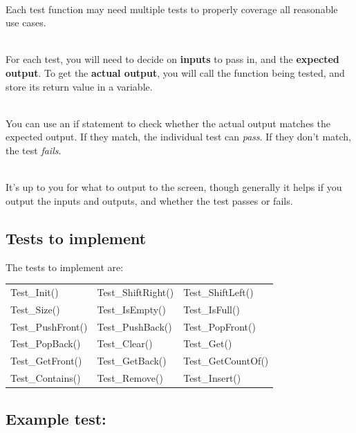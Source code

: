     ~\\ Each test function may need multiple tests to properly coverage all reasonable
    use cases.

    ~\\ For each test, you will need to decide on \textbf{inputs} to pass in,
    and the \textbf{expected output}. To get the \textbf{actual output}, you will
    call the function being tested, and store its return value in a variable.

    ~\\ You can use an if statement to check whether the actual output matches
    the expected output. If they match, the individual test can \textit{pass}.
    If they don't match, the test \textit{fails}.

    ~\\ It's up to you for what to output to the screen, though generally it helps
    if you output the inputs and outputs, and whether the test passes or fails.

    \subsection{Tests to implement}

    The tests to implement are:

    \begin{center}
        \begin{tabular}{p{4cm} p{4cm} p{4cm} }
        Test\_Init() &
        Test\_ShiftRight() &
        Test\_ShiftLeft()
        \\
        Test\_Size() &
        Test\_IsEmpty() &
        Test\_IsFull()
        \\
        Test\_PushFront() &
        Test\_PushBack() &
        Test\_PopFront()
        \\
        Test\_PopBack() &
        Test\_Clear() &
        Test\_Get()
        \\
        Test\_GetFront() &
        Test\_GetBack() &
        Test\_GetCountOf()
        \\
        Test\_Contains() &
        Test\_Remove() &
        Test\_Insert()
        \end{tabular}
    \end{center}

\subsection{Example test:}

